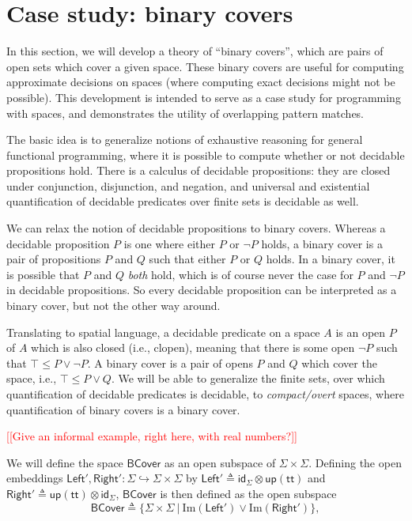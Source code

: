 \documentclass[conference]{IEEEtran}
\newcommand{\hookto}{\hookrightarrow}
\newcommand{\suchthat}{\ |\ }
\newcommand{\Img}[1]{\text{Im}\left({#1}\right)}
\newcommand{\note}[1]{\textcolor{red}{[[{#1}]]}}
\newcommand{\strue}{\mathsf{up}(\mathsf{tt})}
\begin{document}
\section{Case study: binary covers}
\label{s:bcover}

In this section, we will develop a theory of ``binary covers'', which are pairs of open sets which cover a given space. These binary covers are useful for computing approximate decisions on spaces (where computing exact decisions might not be possible). This development is intended to serve as a case study for programming with spaces, and demonstrates the utility of overlapping pattern matches.

The basic idea is to generalize notions of exhaustive reasoning for general functional programming, where it is possible to compute whether or not decidable propositions hold. There is a calculus of decidable propositions: they are closed under conjunction, disjunction, and negation, and universal and existential quantification of decidable predicates over finite sets is decidable as well.

We can relax the notion of decidable propositions to binary covers. Whereas a decidable proposition $P$ is one where either $P$ or $\neg P$ holds, a binary cover is a pair of propositions $P$ and $Q$ such that either $P$ or $Q$ holds. In a binary cover, it is possible that $P$ and $Q$ \emph{both} hold, which is of course never the case for $P$ and $\neg P$ in decidable propositions. So every decidable proposition can be interpreted as a binary cover, but not the other way around.

Translating to spatial language, a decidable predicate on a space $A$ is an open $P$ of $A$ which is also closed (i.e., clopen), meaning that there is some open $\neg P$ such that $\top \le P \vee \neg P$. A binary cover is a pair of opens $P$ and $Q$ which cover the space, i.e., $\top \le P \vee Q$. We will be able to generalize the finite sets, over which quantification of decidable predicates is decidable, to \emph{compact/overt} spaces, where quantification of binary covers is a binary cover.

\note{Give an informal example, right here, with real numbers?}

We will define the space $\mathsf{BCover}$ as an open subspace of $\Sigma \times \Sigma$. Defining the open embeddings $\mathsf{Left}', \mathsf{Right}' : \Sigma \hookto \Sigma \times \Sigma$ by 
$\mathsf{Left}' \triangleq \mathsf{id}_\Sigma \otimes \strue$ and
$\mathsf{Right}' \triangleq \strue \otimes \mathsf{id}_\Sigma$,
$\mathsf{BCover}$ is then defined as the open subspace
\[
\mathsf{BCover} \triangleq \{ \Sigma \times \Sigma \suchthat \Img{\mathsf{Left}'} \vee \Img{\mathsf{Right}'} \},
\]
\end{document}
